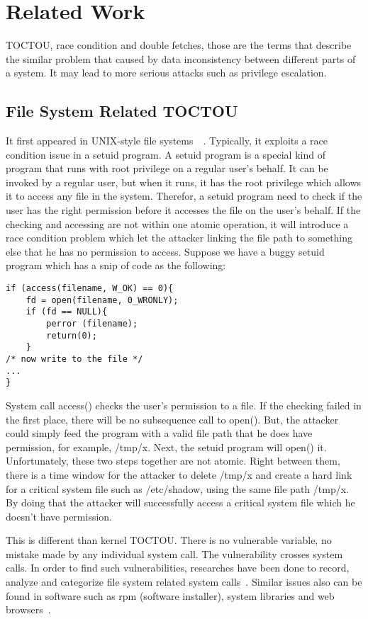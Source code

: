 \section{Related Work}
\label{sec:relatedwork}
TOCTOU, race condition and double fetches, those are the terms that describe the similar problem that caused by data inconsistency between different parts of a system. It may lead to more serious attacks such as privilege escalation.

\subsection{File System Related TOCTOU}
It first appeared in UNIX-style file systems~\cite{bishop1996checking}~\cite{bishop1995race}. Typically, it exploits a race condition issue in a setuid program. A setuid program is a special kind of program that runs with root privilege on a regular user's behalf. It can be invoked by a regular user, but when it runs, it has the root privilege which allows it to access any file in the system. Therefor, a setuid program need to check if the user has the right permission before it accesses the file on the user's behalf. If the checking and accessing are not within one atomic operation, it will introduce a race condition problem which let the attacker linking the file path to something else that he has no permission to access. Suppose we have a buggy setuid program  which has a snip of code as the following:

\begin{lstlisting}[basicstyle=\small,style=redkeyword] 
if (access(filename, W_OK) == 0){
	fd = open(filename, 0_WRONLY);
	if (fd == NULL){
		perror (filename);
		return(0);
	}
/* now write to the file */
...
}
\end{lstlisting}

System call access() checks the user's permission to a file. If the checking failed in the first place, there will be no subsequence call to open(). But, the attacker could simply feed the program with a valid file path that he does have permission, for example, /tmp/x. Next, the setuid program will open() it. Unfortunately, these two steps together are not atomic. Right between them, there is a time window for the attacker to delete /tmp/x and create a hard link for a critical system file such as /etc/shadow, using the same file path /tmp/x. By doing that the attacker will successfully access a critical system file which he doesn't have permission.

This is different than kernel TOCTOU. There is no vulnerable variable, no mistake made by 
any individual system call. The vulnerability crosses system calls. In order to find such vulnerabilities, researches have been done to record, analyze and categorize file system related system calls~\cite{wei2005tocttou}. Similar issues also  can be found in software such as rpm (software installer), system libraries and web browsers~\cite{yang2012concurrency}.

